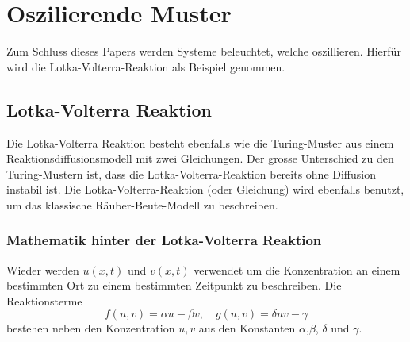 %
%
%
%
\section{Oszilierende Muster
\label{reaktdiff:section:teil2}}
Zum Schluss dieses Papers werden Systeme beleuchtet, welche oszillieren.
Hierfür wird die Lotka-Volterra-Reaktion als Beispiel genommen.


\subsection{Lotka-Volterra Reaktion 
\label{reaktdiff:subsection:bonorum}}

Die Lotka-Volterra Reaktion \cite{Wikipedia_LotkaVolterra_2025}  besteht ebenfalls wie die Turing-Muster aus einem Reaktionsdiffusionsmodell mit zwei Gleichungen.
Der grosse Unterschied zu den Turing-Mustern ist, dass die Lotka-Volterra-Reaktion bereits ohne Diffusion instabil ist.
Die Lotka-Volterra-Reaktion (oder Gleichung) wird ebenfalls benutzt, um das klassische Räuber-Beute-Modell zu beschreiben.

\subsubsection{Mathematik hinter der Lotka-Volterra Reaktion}

Wieder werden \(u(x,t)\) und \(v(x,t)\) verwendet um die Konzentration an einem bestimmten Ort zu einem bestimmten Zeitpunkt zu beschreiben.
Die Reaktionsterme
\begin{equation}
     f(u,v) = \alpha u -  \beta v, \quad g(u,v)= \delta uv - \gamma
      \label{reaktdiff:equation:lvsys}
\end{equation}
bestehen neben den Konzentration \(u,v\) aus den Konstanten \(\alpha\),\(\beta\), \(\delta\) und \(\gamma\).

